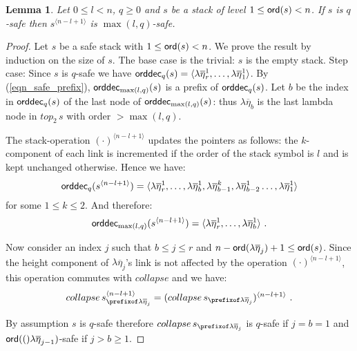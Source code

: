 \documentclass[a4paper]{article}
\newtheorem{lemma}{Lemma}[section]
\theoremstyle{remark}
\theoremstyle{definition}
\newcommand\orddec{{\sf orddec}}
\begin{document}
\begin{lemma}
\label{lem:incrk_qsafe}
Let $0\leq l < n$, $q\geq 0$ and $s$ be a stack of level $1\leq {\sf ord}(s) <n$.
If $s$ is $q$-safe then $s^{\langle n-l+1 \rangle}$ is $\max(l,q)$-safe.
\end{lemma}
\begin{proof}
Let $s$ be a safe stack with $1\leq {\sf ord}(s) <n$. We prove the result by induction on the size of $s$.
The base case is the trivial: $s$ is the empty stack.
Step case: Since $s$ is $q$-safe we have
$\orddec_q(s) = \langle \lambda \overline{\eta}_r^1
, \ldots, \lambda \overline{\eta}_1^1   \rangle$.
By (\ref{eqn_safe_prefix}), $\orddec_{\max(l,q)}(s)$ is a prefix of $\orddec_q(s)$.
Let $b$ be the index in $\orddec_q(s)$ of the last node of $\orddec_{\max(l,q)}(s)$:
thus $\lambda\overline\eta_b$ is the last lambda node in $top_2\, s$ with order $>\max(l,q)$.

The stack-operation $(\cdot)^{\langle n-l+1 \rangle}$ updates the pointers as follows:
the $k$-component of each link is incremented if the order of the stack symbol is $l$ and is kept unchanged otherwise.
Hence we have:
\begin{equation*}
\orddec_q(s^{\langle n-l+1 \rangle}) = \langle
\lambda \overline{\eta}_r^1, \ldots,  \lambda \overline{\eta}_{b}^1, \lambda \overline{\eta}_{b-1}^{k}, \lambda \overline{\eta}_{b-2}^1 \ldots,
 \lambda \overline{\eta}_1^{1} \rangle
\end{equation*}
for some $1 \leq k\leq 2$. And therefore:
\begin{equation}
\orddec_{\max(l,q)}(s^{\langle n-l+1 \rangle}) = \langle \lambda \overline{\eta}_r^1
, \ldots, \lambda \overline{\eta}_b^1 \rangle\ . \label{eqn:trivialityofcollapse}
\end{equation}

Now consider an index $j$ such that $b\leq j \leq r$ and $n-{\sf ord}(\lambda\overline\eta_j) +1 \leq {\sf ord}(s)$.
Since the height component of $\lambda\overline\eta_j$'s link is not affected by the operation
$(\cdot)^{\langle n-l+1 \rangle}$, this operation commutes with $collapse$ and we have:
\begin{equation}
 collapse\, s^{\langle n-l+1 \rangle}_{\prefixof \lambda \overline{\eta}_{j}}
= (collapse\, s_{\prefixof \lambda \overline{\eta}_{j}})^{\langle n-l+1 \rangle} \ . \label{eqn:commutecollapse}
\end{equation}

By assumption $s$ is $q$-safe therefore $collapse\,s_{\prefixof \lambda \overline{\eta}_{j}}$ is $q$-safe
if $j=b=1$ and ${\sf ord}(()\lambda\overline\eta_{j-1})$-safe if $j>b\geq1$.


\end{proof}
\end{document}
